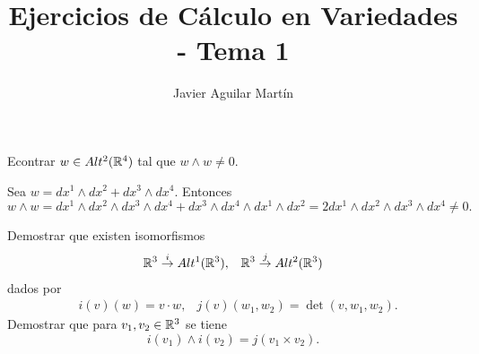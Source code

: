 \documentclass[twoside]{article}
\begin{document}
\title{Ejercicios de Cálculo en Variedades - Tema 1}
\author{Javier Aguilar Martín}
\maketitle


\begin{ejercicio}{2}
Econtrar $w\in Alt^2(\mathbb{R}^4)$ tal que $w\land w\neq 0$.
\end{ejercicio}
\begin{solucion}
Sea $w=dx^1\land dx^2 +dx^3\land dx^4$. Entonces
$$w\land w= dx^1\land dx^2\land dx^3\land dx^4 +dx^3\land dx^4\land dx^1\land dx^2=2dx^1\land dx^2\land dx^3\land dx^4 \neq 0.$$
\end{solucion}

\newpage

\begin{ejercicio}{3}
Demostrar que existen isomorfismos
\begin{align*}
&\mathbb{R}^3\overset{i}{\to} Alt^1(\mathbb{R}^3), &\mathbb{R}^3\overset{j}{\to} Alt^2(\mathbb{R}^3)
\end{align*}
dados por
\begin{align*}
& i(v)(w)=v\cdot w, & j(v)(w_1,w_2)=\det(v,w_1,w_2).
\end{align*}
Demostrar que para $v_1,v_2\in\mathbb{R}^3$ se tiene
$$i(v_1)\land i(v_2)=j(v_1\times v_2).$$
\end{ejercicio}
\end{document}
